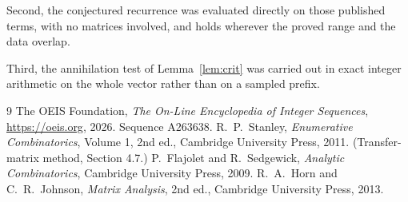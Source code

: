 \documentclass[11pt,a4paper]{article}
\theoremstyle{plain}
\theoremstyle{definition}
\begin{document}
Second, the conjectured recurrence was evaluated directly on those published terms, with no
matrices involved, and holds wherever the proved range and the data overlap.

Third, the annihilation test of Lemma~\ref{lem:crit} was carried out in exact integer
arithmetic on the whole vector rather than on a sampled prefix.

\begin{thebibliography}{9}
 The OEIS Foundation, \emph{The On-Line Encyclopedia of Integer
Sequences}, \url{https://oeis.org}, 2026. Sequence A263638.
 R.~P.~Stanley, \emph{Enumerative Combinatorics}, Volume 1, 2nd ed.,
Cambridge University Press, 2011. (Transfer-matrix method, Section 4.7.)
 P.~Flajolet and R.~Sedgewick, \emph{Analytic Combinatorics}, Cambridge
University Press, 2009.
 R.~A.~Horn and C.~R.~Johnson, \emph{Matrix Analysis}, 2nd ed., Cambridge
University Press, 2013.
\end{thebibliography}
\end{document}
